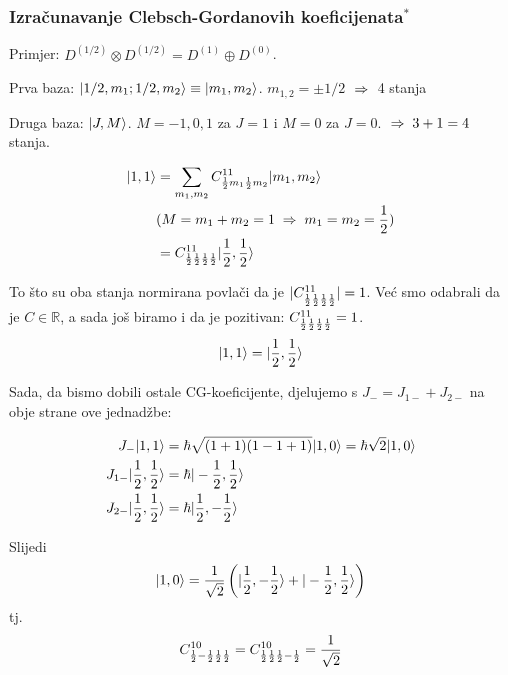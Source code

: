 \subsubsection{Izračunavanje Clebsch-Gordanovih koeficijenata$^*$}
\label{tripletsinglet}

Primjer: 
 $D^{(1/2)}\otimes D^{(1/2)} = D^{(1)} \oplus D^{(0)}$.

Prva baza: $| 1/2, m_1; 1/2, m_2 \rangle\equiv| m_1, m_2 \rangle$.
$m_{1,2}=\pm 1/2$ $\;\Rightarrow\;$ 4 stanja

Druga baza: $| J, M \rangle$. $M=-1, 0, 1$ za $J=1$ i $M=0$ za $J=0$.
$\;\Rightarrow\; 3+1=4$ stanja.

\begin{equation*}
\begin{split}
 | 1,1 \rangle &= \sum_{m_1, m_2}C^{1 1}_{\frac{1}{2} m_1 \frac{1}{2} m_2}| m_1, m_2 \rangle\\
& (M=m_1+m_2=1 \;\Rightarrow\; m_1=m_2=\frac{1}{2} )\\
&= C^{1 1}_{\frac{1}{2} \frac{1}{2} \frac{1}{2} \frac{1}{2}}| \frac{1}{2}, \frac{1}{2} \rangle
\end{split}
\end{equation*}

To što su oba stanja normirana povlači da je $|C^{1 1}_{\frac{1}{2} \frac{1}{2}
\frac{1}{2} \frac{1}{2}}|=1$. Već smo odabrali da je $C\in\mathbb{R}$, a sada
još biramo i da je pozitivan: 
$C^{1 1}_{\frac{1}{2} \frac{1}{2} \frac{1}{2} \frac{1}{2}}=1$.
\begin{displaymath}
    | 1, 1 \rangle = | \frac{1}{2}, \frac{1}{2} \rangle
\end{displaymath}

Sada, da bismo dobili ostale CG-koeficijente,
djelujemo s $J_- = J_{1-}+J_{2-}$ na obje strane ove jednadžbe:

\begin{align*}
J_- | 1, 1 \rangle&=\hbar \sqrt{(1+1)(1-1+1)} | 1,0 \rangle =\hbar\sqrt{2}| 1, 0 \rangle\\
J_{1-} | \frac{1}{2}, \frac{1}{2} \rangle&=\hbar| -\frac{1}{2}, \frac{1}{2} \rangle\\
J_{2-} | \frac{1}{2}, \frac{1}{2} \rangle&=\hbar| \frac{1}{2}, -\frac{1}{2} \rangle\\
\end{align*}

Slijedi
\begin{displaymath}
 | 1, 0 \rangle = \frac{1}{\sqrt{2}}\left(| \frac{1}{2}, -\frac{1}{2} \rangle+
| -\frac{1}{2}, \frac{1}{2} \rangle\right)
\end{displaymath}
tj.
\begin{displaymath}
C^{1 0}_{\frac{1}{2} -\frac{1}{2} \frac{1}{2} \frac{1}{2}}=
C^{1 0}_{\frac{1}{2}  \frac{1}{2} \frac{1}{2} -\frac{1}{2}} = \frac{1}{\sqrt{2}}
\end{displaymath}

